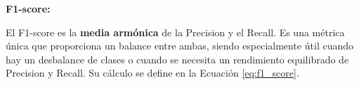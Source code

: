 
\textbf{F1-score:}

El F1-score es la \textbf{media armónica} de la Precision y el Recall. Es una métrica única que proporciona un balance entre ambas, siendo especialmente útil cuando hay un desbalance de clases o cuando se necesita un rendimiento equilibrado de Precision y Recall. Su cálculo se define en la Ecuación \ref{eq:f1_score}.




